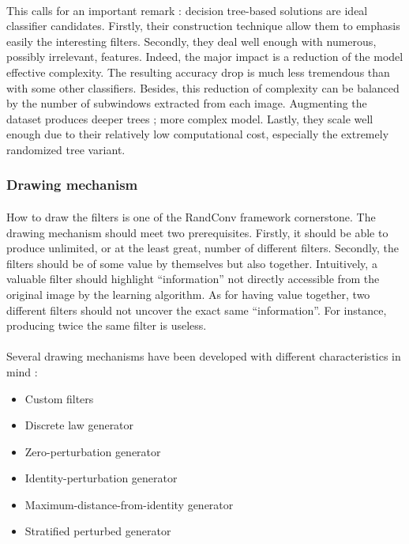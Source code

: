 \documentclass[a4paper]{report}
\begin{document}
		\paragraph{}
		This calls for an important remark : decision tree-based solutions are ideal classifier candidates. Firstly, their construction technique allow them to emphasis easily the interesting filters. Secondly, they deal well enough with numerous, possibly irrelevant, features. Indeed, the major impact is a reduction of the model effective complexity. The resulting accuracy drop is much less tremendous than with some other classifiers. Besides, this reduction of complexity can be balanced by the number of subwindows extracted from each image. Augmenting the dataset produces deeper trees ; more complex model. Lastly, they scale well enough due to their relatively low computational cost, especially the extremely randomized tree variant.
		
			
			
			\subsubsection{Drawing mechanism}
			\paragraph{}
			How to draw the filters is one of the RandConv framework cornerstone. The drawing mechanism should meet two prerequisites. Firstly, it should be able to produce unlimited, or at the least great, number of different filters. Secondly, the filters should be of some value by themselves but also together. Intuitively, a valuable filter should highlight ``information'' not directly accessible from the original image by the learning algorithm. As for having value together, two different filters should not uncover the exact same ``information''. For instance, producing twice the same filter is useless.
			
			\paragraph{}
			Several drawing mechanisms have been developed with different characteristics in mind :
			
			\begin{itemize}
				\item Custom filters
				\item Discrete law generator
				\item Zero-perturbation generator
				\item Identity-perturbation generator
				\item Maximum-distance-from-identity generator
				\item Stratified perturbed generator
			\end{itemize}
			
\end{document}
